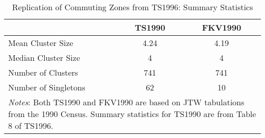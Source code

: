 
\begin{table}\centering
\caption{Replication of Commuting Zones from TS1996: Summary Statistics \label{tab:replication}}
\begin{tabular}{lcc}
\hline\hline
       & TS1990 &  FKV1990  \\
       \hline
Mean Cluster Size &  4.24  & 4.19 \\
Median Cluster Size & 4 & 4 \\
Number of Clusters & 741 & 741  \\
Number of Singletons & 62 &  10 \\
\hline
\multicolumn{3}{p{4in}}{\footnotesize \textit{Notes}: Both TS1990 and FKV1990 are based on JTW tabulations from the 1990 Census. Summary statistics for TS1990 are from Table 8 of TS1996.}\\
\end{tabular}
\end{table}

